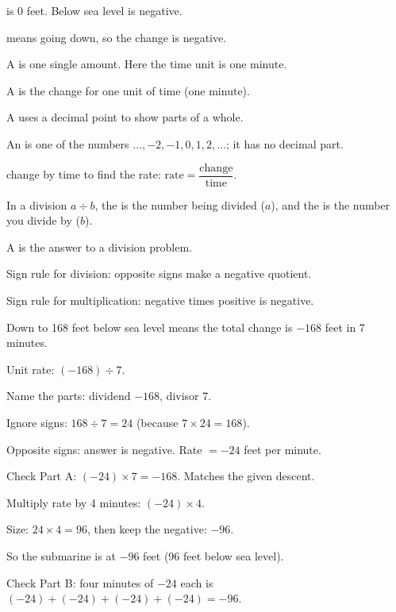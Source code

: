 \begin{words}
  \item {}is 0 feet. Below sea level is negative.
  \item {}means going down, so the change is negative.
  \item A is one single amount. Here the time unit is one minute.
  \item A is the change for one unit of time (one minute).
  \item A uses a decimal point to show parts of a whole.
  \item An is one of the numbers $\ldots, -2, -1, 0, 1, 2, \ldots$; it has no decimal part.
  \item {}change by time to find the rate: $\text{rate} = \dfrac{\text{change}}{\text{time}}$.
  \item In a division $a \div b$, the is the number being divided ($a$), and the is the number you divide by ($b$).
  \item A is the answer to a division problem.
  \item Sign rule for division: opposite signs make a negative quotient.
  \item Sign rule for multiplication: negative times positive is negative.
\end{words}

\begin{steps}
  \item {}Down to 168 feet below sea level means the total change is $-168$ feet in 7 minutes.
  \item Unit rate: $(-168) \div 7$.
  \item Name the parts: dividend $-168$, divisor 7.
  \item Ignore signs: $168 \div 7 = 24$ (because $7 \times 24 = 168$).
  \item Opposite signs: answer is negative. Rate $= -24$ feet per minute.
  \item Check Part A: $(-24) \times 7 = -168$. Matches the given descent.
  \item {}Multiply rate by 4 minutes: $(-24) \times 4$.
  \item Size: $24 \times 4 = 96$, then keep the negative: $-96$.
  \item So the submarine is at $-96$ feet (96 feet below sea level).
  \item Check Part B: four minutes of $-24$ each is $(-24) + (-24) + (-24) + (-24) = -96$.
\end{steps}

